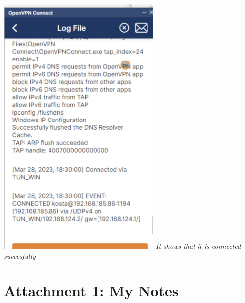 \documentclass[12pt, letterpaper]{article}
\begin{document}
\hfill\break
\hfill\break
\includegraphics[width=0.6\textwidth]{fotos/Week 6/Vpn/Vpn connect log.jpeg}
\break
\emph{It shows that it is connected succesfully}
\hfill\break
\hfill\break
\newpage
\section{Attachment 1: My Notes}
\end{document}

